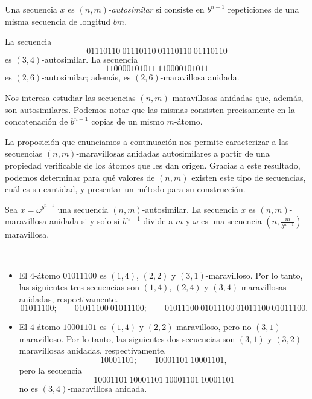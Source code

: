 \begin{definition}
	Una secuencia $x$ es $(n,m)$-\emph{autosimilar} si consiste en $b^{n-1}$
	repeticiones de una misma secuencia de longitud $bm$.
\end{definition}

\begin{example}
	La secuencia \[ 01110110\ 01110110\ 01110110\ 01110110 \] es
	$(3,4)$-autosimilar.
	La secuencia \[ 110000101011 \ 110000101011 \] es $(2,6)$-autosimilar; además,
	es $(2,6)$-maravillosa anidada.
\end{example}

Nos interesa estudiar las secuencias $(n,m)$-maravillosas anidadas que, además,
son autosimilares.
Podemos notar que las mismas consisten precisamente en la concatenación
de $b^{n-1}$ copias de un mismo $m$-átomo.

La proposición que enunciamos a continuación nos permite caracterizar a
las secuencias $(n,m)$-maravillosas anidadas autosimilares a
partir de una propiedad verificable de los átomos que les dan origen.
Gracias a este resultado, podemos determinar para qué valores de $(n,m)$ existen
este tipo de secuencias, cuál es su cantidad, y presentar un método para su
construcción.

\begin{proposition}
	\label{proposition:autosimilar-nm-characterization}
	Sea $x = \omega^{b^{n-1}}$ una secuencia $(n,m)$-autosimilar.
	La secuencia $x$ es $(n,m)$-maravillosa anidada si y solo si $b^{n-1}$
	divide a $m$ y $\omega$
	es una secuencia $\left( n, \frac{m}{b^{n-1}} \right)$-maravillosa.
\end{proposition}

\begin{examples}\ %
	\begin{itemize}
		\item El $4$-átomo $01011100$ es $(1,4)$, $(2,2)$ y
		      $(3,1)$-maravilloso.
		      Por lo tanto, las siguientes tres secuencias son $(1,4)$, $(2,4)$ y
		      $(3,4)$-maravillosas anidadas, respectivamente.
		      \[ 01011100; \qquad 01011100\ 01011100; \qquad 01011100\
			      01011100\ 01011100\ 01011100.
		      \]
		\item El $4$-átomo $10001101$ es $(1,4)$ y $(2,2)$-maravilloso,
		      pero no $(3,1)$-maravilloso.
		      Por lo tanto, las siguientes dos secuencias son $(3,1)$ y $(3,2)$-maravillosas
		      anidadas, respectivamente.
		      \[ 10001101; \qquad 10001101\ 10001101,
		      \]
		      pero la secuencia
		      \[ 10001101\ 10001101\ 10001101\
			      10001101 \]
		      no es $(3,4)$-maravillosa anidada.
	\end{itemize}
\end{examples}

